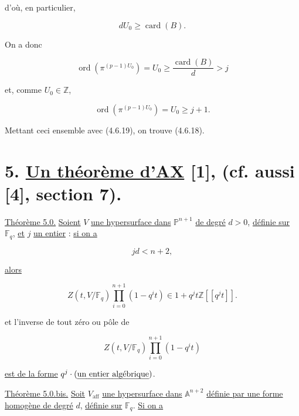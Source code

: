 d'où, en particulier,

\begin{equation}\tag{4.6.21}
dU_0\geq\operatorname{card}(B).
\end{equation}

On a donc

\begin{equation}\tag{4.6.22}
\operatorname{ord}\!\left(\pi^{(p-1)U_0}\right)
=U_0\geq\frac{\operatorname{card}(B)}d>j
\end{equation}

et, comme $U_0\in\mathbb Z$,

\begin{equation}\tag{4.6.23}
\operatorname{ord}\!\left(\pi^{(p-1)U_0}\right)
=U_0\geq j+1.
\end{equation}

Mettant ceci ensemble avec (4.6.19), on trouve (4.6.18).


\section*{5. \underline{Un théorème d'AX} [1], (cf. aussi [4], section 7).}

\underline{Théorème 5.0.}
\underline{Soient} $V$ \underline{une hypersurface dans} $\mathbb P^{n+1}$ \underline{de degré} $d>0$, \underline{définie
sur} $\mathbb F_q$, \underline{et} $j$ \underline{un entier} : \underline{si on a}

\begin{equation}\tag{5.0.1}
jd<n+2,
\end{equation}

\underline{alors}

\begin{equation}\tag{5.0.2}
Z(t,V/\mathbb F_q)\prod_{i=0}^{n+1}(1-q^it)
\in1+q^jt\mathbb Z[[q^jt]].
\end{equation}

et l'inverse de tout zéro ou pôle de

\begin{equation}\tag{5.0.3}
Z(t,V/\mathbb F_q)\prod_{i=0}^{n+1}(1-q^it)
\end{equation}

\noindent
\underline{est de la forme} $q^j\cdot(\text{\underline{un entier algébrique}})$.

\underline{Théorème 5.0.bis.}
\underline{Soit} $V_{\mathrm{aff}}$ \underline{une hypersurface dans} $\mathbb A^{n+2}$ \underline{définie
par une forme homogène de degré} $d$, \underline{définie sur} $\mathbb F_q$. \underline{Si on a}

